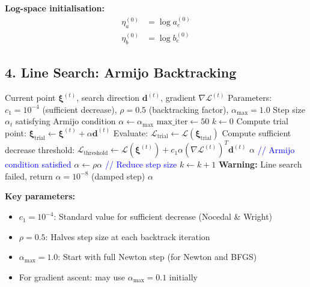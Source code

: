 \documentclass[11pt]{article}
\begin{document}
\textbf{Log-space initialisation:}
\begin{align}
\eta_a^{(0)} &= \log a_e^{(0)}\\
\eta_b^{(0)} &= \log b_e^{(0)}
\end{align}

\subsection*{4. Line Search: Armijo Backtracking}

\begin{algorithm}[H]
\caption{Armijo Backtracking Line Search}
\begin{algorithmic}[1]
\REQUIRE Current point $\bm{\xi}^{(t)}$, search direction $\bm{d}^{(t)}$, gradient $\nabla \mathcal{L}^{(t)}$
\REQUIRE Parameters: $c_1 = 10^{-4}$ (sufficient decrease), $\rho = 0.5$ (backtracking factor), $\alpha_{\max} = 1.0$
\ENSURE Step size $\alpha_t$ satisfying Armijo condition
\STATE $\alpha \leftarrow \alpha_{\max}$
\STATE $\text{max\_iter} \leftarrow 50$
\STATE $k \leftarrow 0$
    \STATE Compute trial point: $\bm{\xi}_{\text{trial}} \leftarrow \bm{\xi}^{(t)} + \alpha \bm{d}^{(t)}$
    \STATE Evaluate: $\mathcal{L}_{\text{trial}} \leftarrow \mathcal{L}(\bm{\xi}_{\text{trial}})$
    \STATE Compute sufficient decrease threshold: $\mathcal{L}_{\text{threshold}} \leftarrow \mathcal{L}(\bm{\xi}^{(t)}) + c_1 \alpha (\nabla \mathcal{L}^{(t)})^T \bm{d}^{(t)}$
        \RETURN $\alpha$ \quad \textcolor{blue}{// Armijo condition satisfied}
    \ENDIF
    \STATE $\alpha \leftarrow \rho \alpha$ \quad \textcolor{blue}{// Reduce step size}
    \STATE $k \leftarrow k + 1$
\ENDWHILE
\STATE \textbf{Warning:} Line search failed, return $\alpha = 10^{-8}$ (damped step)
\RETURN $\alpha$
\end{algorithmic}
\end{algorithm}

\textbf{Key parameters:}
\begin{itemize}
\item $c_1 = 10^{-4}$: Standard value for sufficient decrease (Nocedal \& Wright)
\item $\rho = 0.5$: Halves step size at each backtrack iteration
\item $\alpha_{\max} = 1.0$: Start with full Newton step (for Newton and BFGS)
\item For gradient ascent: may use $\alpha_{\max} = 0.1$ initially
\end{itemize}
\end{document}
